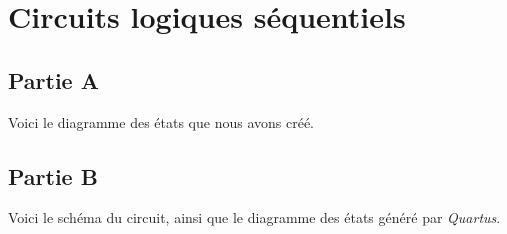 \documentclass[12pt]{article}
\begin{document}
\pagebreak
\section{Circuits logiques séquentiels}
\subsection{Partie A}
Voici le diagramme des états que nous avons créé.

\pagebreak
\subsection{Partie B}
Voici le schéma du circuit, ainsi que le diagramme des états généré par \textsl{Quartus}.

\end{document}
